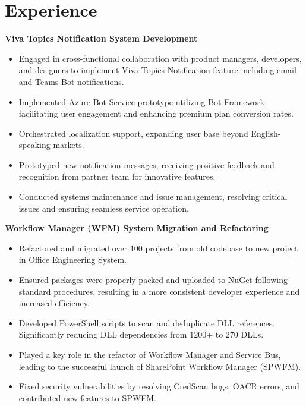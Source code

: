 \documentclass{resume}
\begin{document}



\section{Experience}
\textbf{Viva Topics Notification System Development}
\begin{itemize}
  \item Engaged in cross-functional collaboration with product managers, developers, and designers to implement Viva Topics Notification feature including email and Teams Bot notifications. 
  \item Implemented Azure Bot Service prototype utilizing Bot Framework, facilitating user engagement and enhancing premium plan conversion rates.
  \item Orchestrated localization support, expanding user base beyond English-speaking markets.
  \item Prototyped new notification messages, receiving positive feedback and recognition from partner team for innovative features.
  \item Conducted systems maintenance and issue management, resolving critical issues and ensuring seamless service operation.
\end{itemize}

\textbf{Workflow Manager (WFM) System Migration and Refactoring}
\begin{itemize}
  \item Refactored and migrated over 100 projects from old codebase to new project in Office Engineering System.
  \item Ensured packages were properly packed and uploaded to NuGet following standard procedures, resulting in a more consistent developer experience and increased efficiency. 
  \item Developed PowerShell scripts to scan and deduplicate DLL references. Significantly reducing DLL dependencies from 1200+ to 270 DLLs. 
  \item Played a key role in the refactor of Workflow Manager and Service Bus, leading to the successful launch of SharePoint Workflow Manager (SPWFM). 
  \item Fixed security vulnerabilities by resolving CredScan bugs, OACR errors, and contributed new features to SPWFM. 
\end{itemize}
\end{document}
